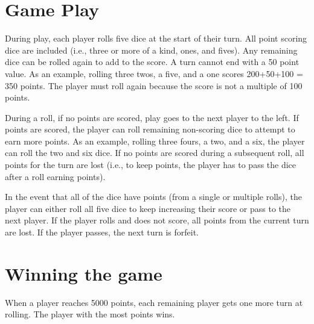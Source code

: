 \documentclass[twocolumn,12pt]{article}
\begin{document}
\section*{Game Play}
During play, each player rolls five dice at the start of their turn.  All point
scoring dice are included (i.e., three or more of a kind, ones, and fives). Any
remaining dice can be rolled again to add to the score.  A turn cannot end
with a 50 point value.  As an example, rolling three twos, a five, and a one
scores 200+50+100 = 350 points.  The player must roll again because the score is
not a multiple of 100 points.

During a roll, if no points are scored, play goes to the next player to the
left.  If
points are scored, the player can roll remaining non-scoring dice to
attempt to earn more points. As
an example, rolling three fours, a two, and a six, the player can roll the
two and six dice.  If no points are scored during a subsequent roll, all points for
the turn are lost (i.e., to keep points, the player has to pass the dice after
a roll earning points). 

In the event that all of the dice have points (from a single or multiple
rolls), the player can either roll all five dice to keep increasing their score
or pass to the next player. If the player rolls and does not score, all points
from the current turn are lost.  If the player passes, the next turn is
forfeit.

\section*{Winning the game}
When a player reaches 5000 points, each
remaining player gets one more turn at rolling. The player with the most
points wins.
\end{document}
